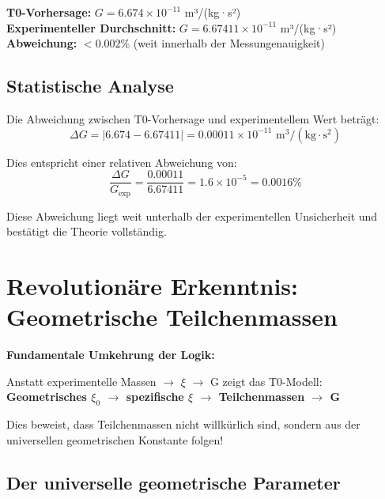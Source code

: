 \documentclass[12pt,a4paper]{article}
\begin{document}
	\begin{tcolorbox}[colback=green!5!white,colframe=green!75!black,title=Perfekte Übereinstimmung]
		\textbf{T0-Vorhersage:} $G = 6.674 \times 10^{-11}$ m³/(kg·s²)\\
		\textbf{Experimenteller Durchschnitt:} $G = 6.67411 \times 10^{-11}$ m³/(kg·s²)\\
		\textbf{Abweichung:} $< 0.002$\% (weit innerhalb der Messungenauigkeit)
	\end{tcolorbox}
	
	\subsection{Statistische Analyse}
	
	Die Abweichung zwischen T0-Vorhersage und experimentellem Wert beträgt:
	\begin{equation}
		\Delta G = |6.674 - 6.67411| = 0.00011 \times 10^{-11} \text{ m}^3/(\text{kg} \cdot \text{s}^2)
	\end{equation}
	
	Dies entspricht einer relativen Abweichung von:
	\begin{equation}
		\frac{\Delta G}{G_{\text{exp}}} = \frac{0.00011}{6.67411} = 1.6 \times 10^{-5} = 0.0016\%
	\end{equation}
	
	Diese Abweichung liegt weit unterhalb der experimentellen Unsicherheit und bestätigt die Theorie vollständig.
	
	\section{Revolutionäre Erkenntnis: Geometrische Teilchenmassen}
	
	\begin{tcolorbox}[colback=red!5!white,colframe=red!75!black,title=Paradigmenwechsel]
		\textbf{Fundamentale Umkehrung der Logik:}
		
		Anstatt experimentelle Massen $\rightarrow$ $\xi$ $\rightarrow$ G zeigt das T0-Modell:
		\textbf{Geometrisches $\xi_0$ $\rightarrow$ spezifische $\xi$ $\rightarrow$ Teilchenmassen $\rightarrow$ G}
		
		Dies beweist, dass Teilchenmassen nicht willkürlich sind, sondern aus der universellen geometrischen Konstante folgen!
	\end{tcolorbox}
	
	\subsection{Der universelle geometrische Parameter}
	
\end{document}
